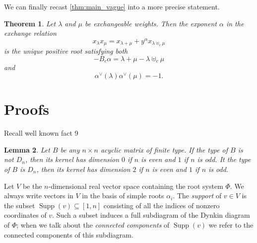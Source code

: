\documentclass[11pt]{amsart}
\newcommand{\Supp}{\operatorname{Supp}}
\newtheorem{theorem}{Theorem}[section]
\newtheorem{lemma}[theorem]{Lemma}
\numberwithin{equation}{section}
\begin{document}
  We can finally recast \cref{thm:main_vague} into a more precise statement.
  \begin{theorem}
    \label{thm:main}
    Let $\lambda$ and $\mu$ be exchangeable weights. 
    Then the exponent $\alpha$ in the exchange relation
    \[
      x_\lambda x_\mu = x_{\lambda+\mu} + y^\alpha x_{\lambda\uplus_c\mu}
    \]
    is the unique positive root satisfying both
    \[
      -B_c\alpha = \lambda+\mu-\lambda\uplus_c\mu
    \]
    and
    \[
      \alpha^\vee(\lambda) \alpha^\vee(\mu) = -1.
    \]
  \end{theorem}
  
  \section{Proofs}
  
  Recall well known fact
  9\begin{lemma}
    Let $B$ be any $n\times n$ acyclic matrix of finite type.
    If the type of $B$ is not $D_n$, then its kernel has dimension $0$ if $n$ is even and $1$ if $n$ is odd.
    It the type of $B$ is $D_n$, then its kernel has dimension $2$ if $n$ is even and $1$ if $n$ is odd.
  \end{lemma}
  
  Let $V$ be the $n$-dimensional real vector space containing the root system $\Phi$.
  We always write vectors in $V$ in the basis of simple roots $\alpha_i$.
  The \emph{support} of $v\in V$ is the subset $\Supp(v)\subseteq [1,n]$ consisting of all the indices of nonzero coordinates of $v$.
  Such a subset induces a full subdiagram of the Dynkin diagram of $\Phi$; when we talk about the \emph{connected components} of $\Supp(v)$ we refer to the connected components of this subdiagram.



\end{document}
